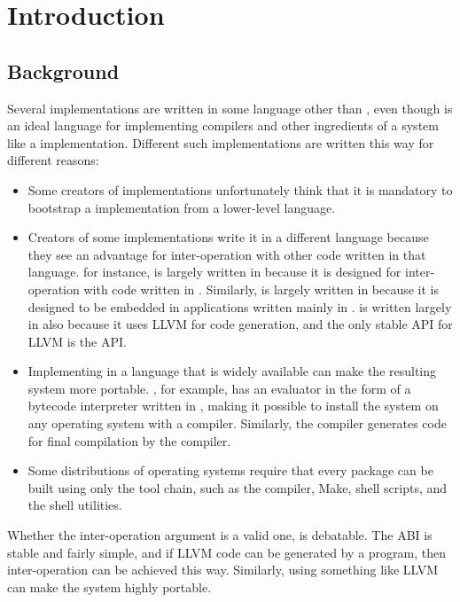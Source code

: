 \chapter{Introduction}
%

\section{Background}

Several \commonlisp{} implementations are written in some
language other than \commonlisp{}, even though \commonlisp{} is an
ideal language for implementing compilers and other ingredients of a
system like a \commonlisp{} implementation.  Different such
implementations are written this way for different reasons:

\begin{itemize}
\item Some creators of \commonlisp{} implementations unfortunately
  think that it is mandatory to bootstrap a \commonlisp{}
  implementation from a lower-level language.
\item Creators of some \commonlisp{} implementations write it in a
  different language because they see an advantage for inter-operation
  with other code written in that language.  \clasp{} for instance, is
  largely written in \cplusplus{} because it is designed for
  inter-operation with code written in \cplusplus{}.  Similarly,
  \ecl{} is largely written in \clanguage{} because it is designed to
  be embedded in applications written mainly in \clanguage{}.  \clasp{}
  is written largely in \cplusplus{} also because it uses LLVM for
  code generation, and the only stable API for LLVM is the
  \cplusplus{} API.
\item Implementing \commonlisp{} in a language that is widely
  available can make the resulting system more portable.  \clisp{},
  for example, has an evaluator in the form of a bytecode interpreter
  written in \clanguage{}, making it possible to install the system on
  any operating system with a \clanguage{} compiler.  Similarly, the
  \ecl{} compiler generates \clanguage{} code for final compilation by
  the \clanguage{} compiler.
\item Some distributions of operating systems require that every
  package can be built using only the \clanguage{} tool chain, such as
  the \clanguage{} compiler, Make, shell scripts, and the \unix{}
  shell utilities.
\end{itemize}

Whether the inter-operation argument is a valid one, is debatable.
The \clanguage{} ABI is stable and fairly simple, and if LLVM code can
be generated by a \commonlisp{} program, then inter-operation can be
achieved this way.  Similarly, using something like LLVM can make the
system highly portable.

